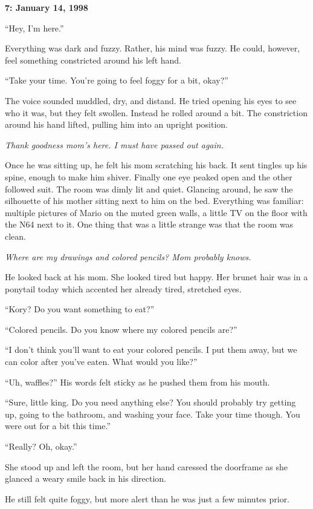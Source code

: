 \documentclass[9pt]{memoir}
\newcommand{\storydate}[1]{\noindent \textbf{#1} \vspace{2em}}
\begin{document}
\storydate{7: January 14, 1998}

``Hey, I'm here.''

Everything was dark and fuzzy. Rather, his mind was fuzzy. He could, however, feel something constricted around his left hand.

``Take your time. You're going to feel foggy for a bit, okay?''

The voice sounded muddled, dry, and distand. He tried opening his eyes to see who it was, but they felt swollen. Instead he rolled around a bit. The constriction around his hand lifted, pulling him into an upright position.

\textit{Thank goodness mom's here. I must have passed out again.}

Once he was sitting up, he felt his mom scratching his back. It sent tingles up his spine, enough to make him shiver. Finally one eye peaked open and the other followed suit. The room was dimly lit and quiet. Glancing around, he saw the silhouette of his mother sitting next to him on the bed. Everything was familiar: multiple pictures of Mario on the muted green walls, a little TV on the floor with the N64 next to it. One thing that was a little strange was that the room was clean.

\textit{Where are my drawings and colored pencils? Mom probably knows.}

He looked back at his mom. She looked tired but happy. Her brunet hair was in a ponytail today which accented her already tired, stretched eyes.

``Kory? Do you want something to eat?''

``Colored pencils. Do you know where my colored pencils are?''

``I don't think you'll want to eat your colored pencils. I put them away, but we can color after you've eaten. What would you like?''

``Uh, waffles?'' His words felt sticky as he pushed them from his mouth.

``Sure, little king. Do you need anything else? You should probably try getting up, going to the bathroom, and washing your face. Take your time though. You were out for a bit this time.''

``Really? Oh, okay.''

She stood up and left the room, but her hand caressed the doorframe as she glanced a weary smile back in his direction.

He still felt quite foggy, but more alert than he was just a few minutes prior.
\end{document}
